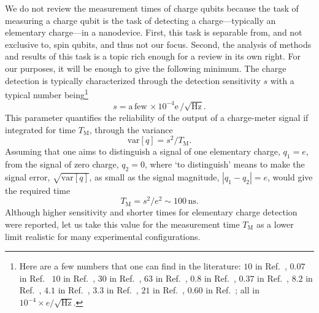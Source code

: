 \documentclass[aps, prx, showpacs, twocolumn, superscriptaddress, notitlepage, longbibliography, floatfix, nofootinbib]{revtex4-2}
\begin{document}
We do not review the measurement times of charge qubits because the task of measuring a charge qubit is the task of detecting a charge---typically an elementary charge---in a nanodevice. First, this task is separable from, and not exclusive to, spin qubits, and thus not our focus. Second, the analysis of methods and results of this task is a topic rich enough for a review in its own right.\cite{gustavsson_electron_2009,clerk_introduction_2010,vigneau_probing_2022} For our purposes, it will be enough to give the following minimum. The charge detection is typically characterized through the detection sensitivity $s$ with a typical number being\footnote
{
Here are a few numbers that one can find in the literature: 
$10$ in Ref.~\cite{reilly_fast_2007},
$0.07$ in Ref.~\cite{angus_silicon_2008} %
$10$ in Ref.~\cite{wang_graphene_2010},
$30$ in Ref.~\cite{fringes_charge_2011}, 
$63$ in Ref.~\cite{colless_dispersive_2013},
$0.8$ in Ref.~\cite{stehlik_fast_2015},
$0.37$ in Ref.~\cite{gonzalez-zalba_probing_2015},
$8.2$ in Ref.~\cite{zajac_scalable_2016},
$4.1$ in Ref.~\cite{zheng_rapid_2019},
$3.3$ in Ref.~\cite{curry_single-shot_2019},
$21$ in Ref.~\cite{chanrion_charge_2020},
$0.60$ in Ref.~\cite{schupp_sensitive_2020};
all in $10^{-4} \times e/\surd{\mathrm{Hz}}$.
} 
\begin{equation}
s = \mathrm{a\,few}\, \times 10^{-4}\mathrm{e}\, / \sqrt{\mathrm{Hz}}.  
\label{eq:chargeSensitivity}
\end{equation}
This parameter quantifies the reliability of the output of a charge-meter signal if integrated for time $T_\mathrm{M}$, through the variance
\begin{equation}
\textrm{var}[q] = s^2 / T_\mathrm{M}.
\end{equation}
Assuming that one aims to distinguish a signal of one elementary charge, $q_1=e$, from the signal of zero charge, $q_2=0$, where `to distinguish' means to make the signal error, $\sqrt{\textrm{var}[q]}$, as small as the signal magnitude, $|q_1-q_2|=e$, would give the required time
\begin{equation}
T_\mathrm{M} = s^2 / e^2 \sim 100\, \mathrm{ns}.
\label{eq:detectionLimit}
\end{equation}
Although higher sensitivity\cite{schaal_fast_2020} and shorter times\cite{keith_single-shot_2019} for elementary charge detection were reported, let us take this value for the measurement time $T_\mathrm{M}$ as a lower limit 
realistic for many experimental configurations. 
\end{document}
